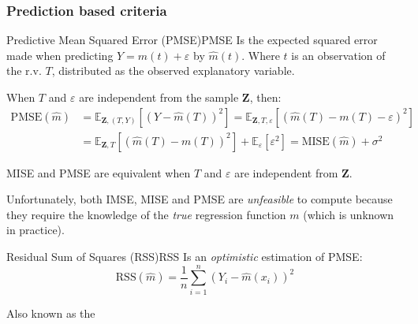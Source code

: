 \subsubsection{Prediction based criteria}
\begin{definition}{Predictive Mean Squared Error (PMSE)}{PMSE}
    Is the expected squared error made when predicting $Y = m(t) + \varepsilon$ by $\hat m(t)$.
    Where $t$ is an observation of the r.v. $T$, distributed as the observed explanatory variable.

    When $T$ and $\varepsilon$ are independent from the sample $\boldsymbol Z$, then:
    \begin{align*}
        \text{PMSE}(\hat m) &= \mathds{E}_{\boldsymbol Z,(T,Y)} \left[
                \left(Y - \hat m(T)\right)^2
        \right]
        = \mathds{E}_{\boldsymbol Z,T,\varepsilon} \left[
                \left(\hat m(T) - m(T) - \varepsilon\right)^2
        \right] \\
        & = \mathds{E}_{\boldsymbol Z,T} \left[
                \left(\hat m(T) - m(T)\right)^2
            \right] + \mathds{E}_\varepsilon\left[\varepsilon^2\right]
            = \text{MISE}(\hat m) + \sigma^2
    \end{align*}
    \tcblower
    \begin{note}
        MISE and PMSE are equivalent when $T$ and $\varepsilon$ are independent from $\boldsymbol Z$.
    \end{note}
\end{definition}

\begin{marker}
    Unfortunately, both IMSE, MISE and PMSE are \emph{unfeasible} to compute
    because they require the knowledge of the \emph{true} regression function
    $m$ (which is unknown in practice).
\end{marker}

\begin{definition}{Residual Sum of Squares (RSS)}{RSS}
Is an \emph{optimistic} estimation of PMSE:
    \begin{equation*}
        \text{RSS}(\hat m) = \frac{1}{n} \sum_{i=1}^n \left( Y_i - \hat m(x_i) \right)^2
    \end{equation*}
    \tcblower
    \begin{note}
        Also known as the 
    \end{note}
\end{definition}

